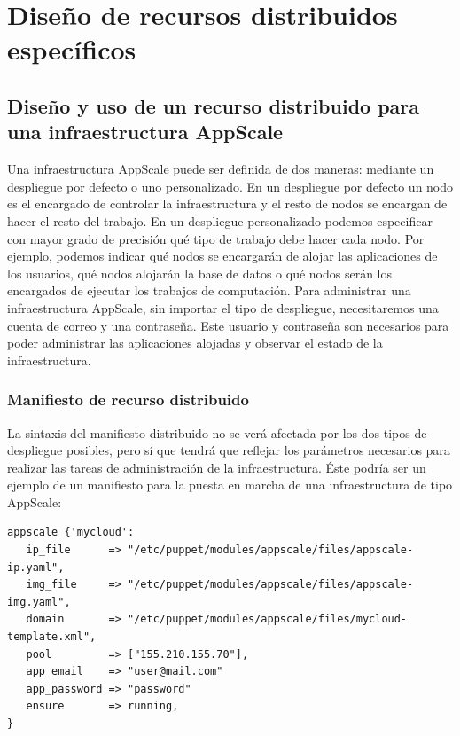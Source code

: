 \chapter{Diseño de recursos distribuidos específicos}
\label{cap:disenyo}


\section{Diseño y uso de un recurso distribuido para una infraestructura AppScale}

Una infraestructura AppScale puede ser definida de dos maneras: mediante un despliegue por defecto o uno personalizado. En un despliegue por defecto un nodo es el encargado de controlar la infraestructura y el resto de nodos se encargan de hacer el resto del trabajo. En un despliegue personalizado podemos especificar con mayor grado de precisión qué tipo de trabajo debe hacer cada nodo. Por ejemplo, podemos indicar qué nodos se encargarán de alojar las aplicaciones de los usuarios, qué nodos alojarán la base de datos o qué nodos serán los encargados de ejecutar los trabajos de computación. Para administrar una infraestructura AppScale, sin importar el tipo de despliegue, necesitaremos una cuenta de correo y una contraseña. Este usuario y contraseña son necesarios para poder administrar las aplicaciones alojadas y observar el estado de la infraestructura.

\subsection{Manifiesto de recurso distribuido}

La sintaxis del manifiesto distribuido no se verá afectada por los dos tipos de despliegue posibles, pero sí que tendrá que reflejar los parámetros necesarios para realizar las tareas de administración de la infraestructura. Éste podría ser un ejemplo de un manifiesto para la puesta en marcha de una infraestructura de tipo AppScale:

\begin{lstlisting}
appscale {'mycloud':
   ip_file      => "/etc/puppet/modules/appscale/files/appscale-ip.yaml",
   img_file     => "/etc/puppet/modules/appscale/files/appscale-img.yaml",
   domain       => "/etc/puppet/modules/appscale/files/mycloud-template.xml",
   pool         => ["155.210.155.70"],
   app_email    => "user@mail.com"
   app_password => "password"
   ensure       => running,
}
\end{lstlisting}

